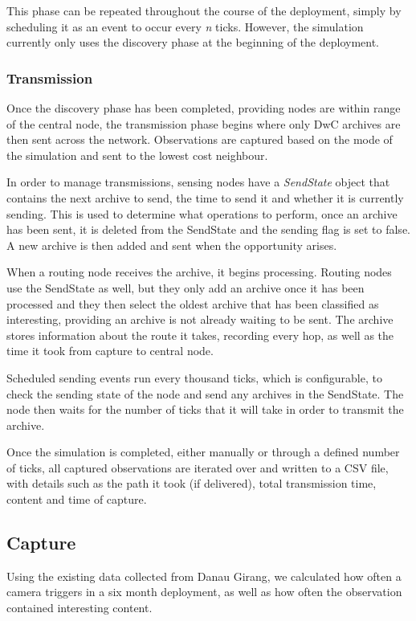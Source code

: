 	This phase can be repeated throughout the course of the deployment, simply by scheduling it as an event to occur every \textit{n} ticks. However, the simulation currently only uses the discovery phase at the beginning of the deployment.
	
\subsubsection{Transmission}
	Once the discovery phase has been completed, providing nodes are within range of the central node, the transmission phase begins where only DwC archives are then sent across the network. Observations are captured based on the mode of the simulation and sent to the lowest cost neighbour.
	
	In order to manage transmissions, sensing nodes have a \textit{SendState} object that contains the next archive to send, the time to send it and whether it is currently sending. This is used to determine what operations to perform, once an archive has been sent, it is deleted from the SendState and the sending flag is set to false. A new archive is then added and sent when the opportunity arises.
	
	When a routing node receives the archive, it begins processing. Routing nodes use the SendState as well, but they only add an archive once it has been processed and they then select the oldest archive that has been classified as interesting, providing an archive is not already waiting to be sent. The archive stores information about the route it takes, recording every hop, as well as the time it took from capture to central node.
	
	Scheduled sending events run every thousand ticks, which is configurable, to check the sending state of the node and send any archives in the SendState. The node then waits for the number of ticks that it will take in order to transmit the archive.
	
	Once the simulation is completed, either manually or through a defined number of ticks, all captured observations are iterated over and written to a CSV file, with details such as the path it took (if delivered), total transmission time, content and time of capture.
	
\subsection{Capture}\label{sims:exp:cap}
	Using the existing data collected from Danau Girang, we calculated how often a camera triggers in a six month deployment, as well as how often the observation contained interesting content. 
	
